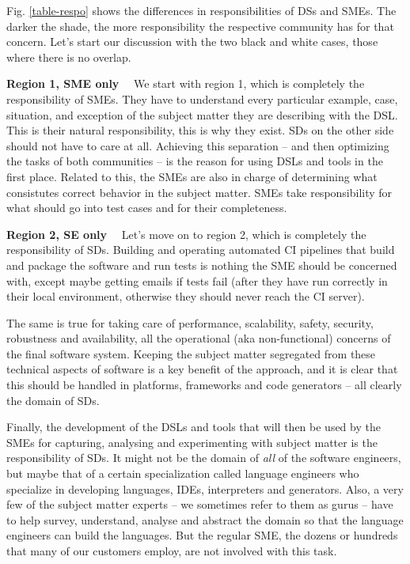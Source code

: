 \documentclass[runningheads]{llncs}
\newcommand\parhead[1]{\vspace{1mm}\noindent\textbf{{#1}}\ \ }
\newcommand{\fig}[1]{Fig. \ref{#1}}  %
\begin{document}
\fig{table-respo} shows the differences in responsibilities of DSs and SMEs. The
darker the shade, the more responsibility the respective community has for that
concern. Let's start our discussion with the two black and white cases, those
where there is no overlap.


\parhead{Region 1, SME only} We start with region 1, which is completely the
responsibility of SMEs. They have to understand every particular example, case,
situation, and exception of the subject matter they are describing with the DSL.
This is their natural responsibility, this is why they exist. SDs on the other
side should not have to care at all. Achieving this separation -- and then
optimizing the tasks of both communities -- is the reason for using DSLs and
tools in the first place. Related to this, the SMEs are also in charge of
determining what consistutes correct behavior in the subject matter.
SMEs take responsibility for what should go into test cases and for their
completeness.

\parhead{Region 2, SE only} Let's move on to region 2, which is completely the
responsibility of SDs.
Building and operating automated CI pipelines that build and package the
software and run tests is nothing the SME should be concerned with, except maybe
getting emails if tests fail (after they have run correctly in their local
environment, otherwise they should never reach the CI server).
 
The same is true for taking care of performance, scalability, 
safety, security, robustness and availability, all the operational
(aka non-functional) concerns of the final software system. Keeping the
subject matter segregated from these technical aspects of software is
a key benefit of the approach, and it is clear that this should be 
handled in platforms, frameworks and code generators -- all clearly
the domain of SDs.

Finally, the development of the DSLs and tools that will then be used by the
SMEs for capturing, analysing and experimenting with subject matter is the
responsibility of SDs. It might not be the domain of \emph{all} of the software
engineers, but maybe that of a certain specialization called language engineers
who specialize in developing languages, IDEs, interpreters and generators. Also,
a very few of the subject matter experts -- we sometimes refer to them as gurus
-- have to help survey, understand, analyse and abstract the domain so that the
language engineers can build the languages. But the regular SME, the dozens or
hundreds that many of our customers employ, are not involved with this task.
\end{document}

